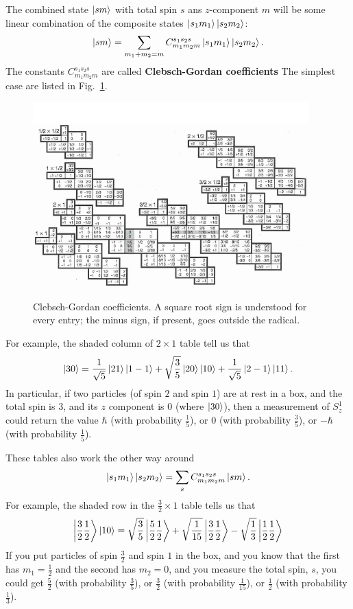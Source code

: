 The combined state $\ket{sm}$ with total spin $s$ ans $z$-component $m$ will be some linear combination of the composite states $\ket{s_1 m_1}\ket{s_2 m_2}$:
\begin{equation}
  \label{eq:4-130}
 \ket{sm}  = \sum_{m_1+m_2=m} C_{m_1m_2m}^{s_1s_2s} \ket{s_1 m_1} \ket{s_2 m_2}.
\end{equation}
The constants $C_{m_1m_2m}^{s_1s_2s}$ are called \textbf{Clebsch-Gordan coefficients}
The simplest case are listed in Fig.~\ref{fig:4-5}.
\begin{figure}[t]
  \centering
  \includegraphics[width=0.95\textwidth]{fig/fig4-4.png}
  \label{fig:4-5}
  \caption{Clebsch-Gordan coefficients. A square root sign is understood for every entry; the minus sign, if present, goes outside the radical.}
\end{figure}
For example, the shaded column of $2\times 1$ table tell us that
\begin{equation*}
\ket{30} = \frac{1}{\sqrt{5}}\ket{21}\ket{1-1} + \sqrt{\frac{3}{5}}\ket{20}\ket{10} + \frac{1}{\sqrt{5}}\ket{2-1}\ket{11}.
\end{equation*}
In particular, if two particles (of spin $2$ and spin $1$) are at rest in a box, and the total spin is $3$, and its $z$ component is $0$ (where $\ket{30}$), then a measurement of $S_z^1$ could return the value $\hbar$ (with probability $\frac{1}{5}$), or $0$ (with probability $\frac{3}{5}$), or $-\hbar$ (with probability $\frac{1}{5}$).

These tables also work the other way around
\begin{equation}
  \label{eq:4-131}
 \ket{s_1 m_1} \ket{s_2 m_2} = \sum_s C_{m_1m_2m}^{s_1s_2s} \ket{sm}.
\end{equation}
For example, the shaded row in the $\frac{3}{2}\times 1$ table tells us that
\begin{equation*}
  \ket{\frac{3}{2} \frac{1}{2}} \ket{10} = \sqrt{\frac{3}{5}} \ket{\frac{5}{2} \frac{1}{2}} + \sqrt{\frac{1}{15}} \ket{\frac{3}{2} \frac{1}{2}} - \sqrt{\frac{1}{3}} \ket{\frac{1}{2} \frac{1}{2}}
\end{equation*}
If you put particles of spin $\frac{3}{2}$ and spin $1$ in the box, and you know that the first has $m_1= \frac{1}{2}$ and the second has $m_2=0$, and you measure the total spin, $s$, you could get $\frac{5}{2}$ (with probability $\frac{3}{5}$), or $\frac{3}{2}$ (with probability $\frac{1}{15}$), or $\frac{1}{2}$ (with probability $\frac{1}{3}$).

